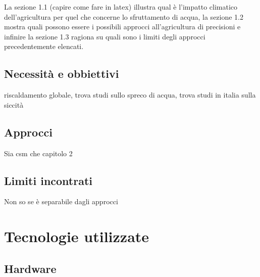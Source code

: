 \documentclass[12pt,a4paper,openright,twoside]{book}
\begin{document}
La sezione 1.1 (capire come fare in latex) illustra qual è l'impatto climatico dell'agricultura per quel che concerne lo sfruttamento di acqua, la sezione 1.2 mostra quali possono essere i possibili approcci all'agricultura di precisioni e infinire la sezione 1.3 ragiona su quali sono i limiti degli approcci precedentemente elencati.

\section{Necessità e obbiettivi}

riscaldamento globale, trova studi sullo spreco di acqua, trova studi in italia sulla siccità

\section{Approcci}

Sia csm che capitolo 2

\section{Limiti incontrati}

Non so se è separabile dagli approcci

\chapter{Tecnologie utilizzate}



\section{Hardware}
\end{document}
